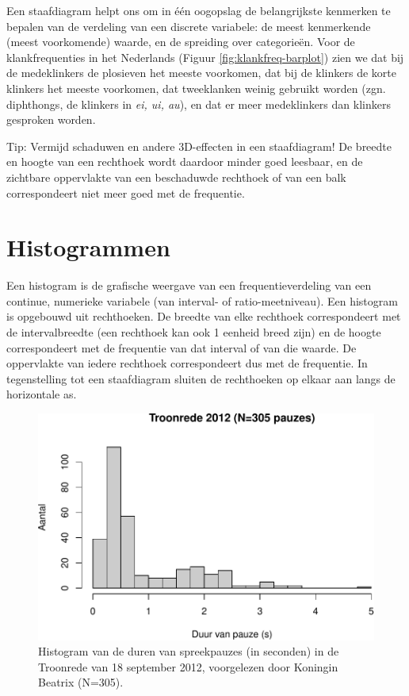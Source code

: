 \documentclass[
]{book}
\begin{document}
Een staafdiagram helpt ons om in één oogopslag de belangrijkste
kenmerken te bepalen van de verdeling van een discrete variabele: de
meest kenmerkende (meest voorkomende) waarde, en de spreiding over
categorieën. Voor de klankfrequenties in het Nederlands
(Figuur \ref{fig:klankfreq-barplot}) zien we dat bij de medeklinkers de
plosieven het meeste voorkomen, dat bij de klinkers de korte klinkers
het meeste voorkomen, dat tweeklanken weinig gebruikt worden (zgn.
diphthongs, de klinkers in \emph{ei, ui, au}), en dat er meer medeklinkers
dan klinkers gesproken worden.

Tip: Vermijd schaduwen en andere 3D-effecten in een staafdiagram! De
breedte en hoogte van een rechthoek wordt daardoor minder goed leesbaar,
en de zichtbare oppervlakte van een beschaduwde rechthoek of van een
balk correspondeert niet meer goed met de frequentie.

\hypertarget{sec:histogrammen}{%
\section{Histogrammen}\label{sec:histogrammen}}

Een histogram is de grafische weergave van een frequentieverdeling van
een continue, numerieke variabele (van interval- of ratio-meetniveau).
Een histogram is opgebouwd uit rechthoeken. De breedte van elke
rechthoek correspondeert met de intervalbreedte (een rechthoek kan ook 1
eenheid breed zijn) en de hoogte correspondeert met de frequentie van
dat interval of van die waarde. De oppervlakte van iedere rechthoek
correspondeert dus met de frequentie. In tegenstelling tot een
staafdiagram sluiten de rechthoeken op elkaar aan langs de horizontale
as.

\begin{figure}
\centering
\includegraphics{KMS-NL_files/figure-latex/troonrede2012-hist-1.pdf}
\caption{\label{fig:troonrede2012-hist}Histogram van de duren van spreekpauzes (in seconden) in de Troonrede van 18 september 2012, voorgelezen door Koningin Beatrix (N=305).}
\end{figure}
\end{document}
